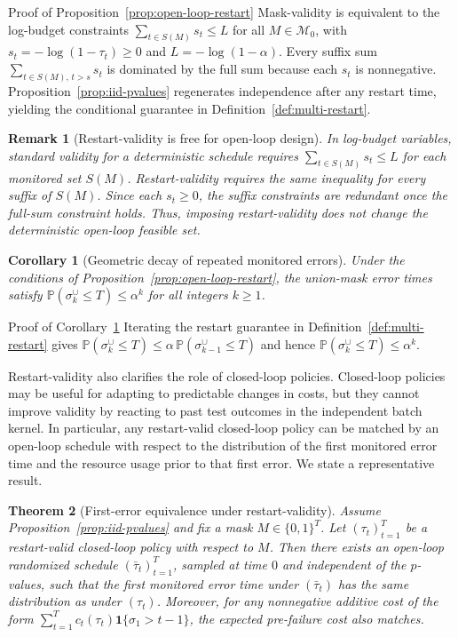 \documentclass{uai2026} %
\newtheorem{theorem}{Theorem}[section]
\newtheorem{corollary}[theorem]{Corollary}
\newtheorem*{remark}{Remark}
\newcommand{\1}{\mathbf{1}}
\newcommand{\ind}[1]{\mathbf{1}\{#1\}}
\newcommand{\prob}{\mathbb{P}}
\newcommand{\mcal}{\mathcal{M}}
\begin{document}
\begin{appendixproof}{Proof of Proposition~\ref{prop:open-loop-restart}}
  Mask-validity is equivalent to the log-budget constraints $\sum_{t\in S(M)} s_t\le L$ for all $M\in\mcal_0$, with $s_t=-\log(1-\tau_t)\ge 0$ and $L=-\log(1-\alpha)$.
  Every suffix sum $\sum_{t\in S(M),\,t>s} s_t$ is dominated by the full sum because each $s_t$ is nonnegative.
  Proposition~\ref{prop:iid-pvalues} regenerates independence after any restart time, yielding the conditional guarantee in Definition~\ref{def:multi-restart}.
\end{appendixproof}

\begin{remark}[Restart-validity is free for open-loop design]
  In log-budget variables, standard validity for a deterministic schedule requires $\sum_{t\in S(M)} s_t\le L$ for each monitored set $S(M)$.
  Restart-validity requires the same inequality for every suffix of $S(M)$.
  Since each $s_t\ge 0$, the suffix constraints are redundant once the full-sum constraint holds.
  Thus, imposing restart-validity does not change the deterministic open-loop feasible set.
\end{remark}

\begin{corollary}[Geometric decay of repeated monitored errors]
  \label{cor:geom-decay}
  Under the conditions of Proposition~\ref{prop:open-loop-restart}, the union-mask error times satisfy $\prob(\sigma^{\cup}_k\le T)\le \alpha^k$ for all integers $k\ge 1$.
\end{corollary}

\begin{appendixproof}{Proof of Corollary~\ref{cor:geom-decay}}
  Iterating the restart guarantee in Definition~\ref{def:multi-restart} gives $\prob(\sigma^{\cup}_k\le T)\le \alpha\,\prob(\sigma^{\cup}_{k-1}\le T)$ and hence $\prob(\sigma^{\cup}_k\le T)\le \alpha^k$.
\end{appendixproof}

Restart-validity also clarifies the role of closed-loop policies.
Closed-loop policies may be useful for adapting to predictable changes in costs, but they cannot improve validity by reacting to past test outcomes in the independent batch kernel.
In particular, any restart-valid closed-loop policy can be matched by an open-loop schedule with respect to the distribution of the first monitored error time and the resource usage prior to that first error.
We state a representative result.

\begin{theorem}[First-error equivalence under restart-validity]
  \label{thm:first-error-equivalence}
  Assume Proposition~\ref{prop:iid-pvalues} and fix a mask $M\in\{0,1\}^T$.
  Let $(\tau_t)_{t=1}^T$ be a restart-valid closed-loop policy with respect to $M$.
  Then there exists an open-loop randomized schedule $(\bar{\tau}_t)_{t=1}^T$, sampled at time $0$ and independent of the $p$-values, such that the first monitored error time under $(\bar{\tau}_t)$ has the same distribution as under $(\tau_t)$.
  Moreover, for any nonnegative additive cost of the form $\sum_{t=1}^T c_t(\tau_t)\ind{\sigma_1>t-1}$, the expected pre-failure cost also matches.
\end{theorem}
\end{document}
